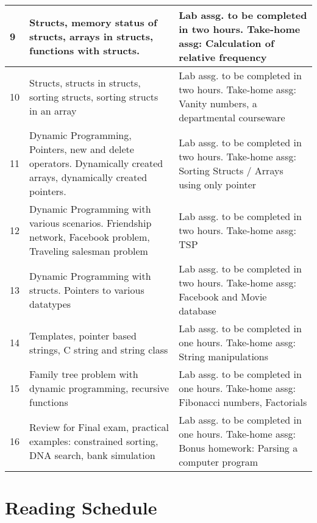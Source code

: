 \documentclass[11pt]{article}
\begin{document}
\begin{center}
\begin{tabular}{|p{0.1in}|p{2.2in}|p{2.2in}|}
\hline
9 & Structs, memory status of structs, arrays in structs, functions with structs. & Lab assg. to be completed in two hours. Take-home assg: Calculation of relative frequency\\
\hline
10 & Structs, structs in structs, sorting structs, sorting structs in an array & Lab assg. to be completed in two hours. Take-home assg: Vanity numbers, a departmental courseware\\
\hline
11 & Dynamic Programming, Pointers, new and delete operators.  Dynamically created arrays, dynamically created pointers. & Lab assg. to be completed in two hours. Take-home assg: Sorting Structs / Arrays using only pointer\\
\hline
12 & Dynamic Programming with various scenarios.  Friendship network, Facebook problem, Traveling salesman problem & Lab assg. to be completed in two hours. Take-home assg: TSP\\
\hline
13 & Dynamic Programming with structs.  Pointers to various datatypes & Lab assg. to be completed in two hours. Take-home assg: Facebook and Movie database\\
\hline
14 & Templates, pointer based strings, C string and string class & Lab assg. to be completed in one hours. Take-home assg: String manipulations\\
\hline
15 & Family tree problem with dynamic programming, recursive functions & Lab assg. to be completed in one hours. Take-home assg: Fibonacci numbers, Factorials\\
\hline
16 & Review for Final exam, practical examples: constrained sorting, DNA search, bank simulation & Lab assg. to be completed in one hours. Take-home assg: Bonus homework: Parsing a computer program\\
\hline
\end{tabular}
\end{center}
\section*{Reading Schedule}
\label{sec-12}
\end{document}
